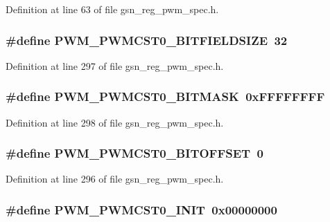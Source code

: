 Definition at line 63 of file gsn\_\-reg\_\-pwm\_\-spec.h.

\hypertarget{a00565_ac70a5c6184a303acb66c6d44fb1c2e29}{
\subsubsection[{PWM\_\-PWMCST0\_\-BITFIELDSIZE}]{\setlength{\rightskip}{0pt plus 5cm}\#define PWM\_\-PWMCST0\_\-BITFIELDSIZE~32}}
\label{a00565_ac70a5c6184a303acb66c6d44fb1c2e29}


Definition at line 297 of file gsn\_\-reg\_\-pwm\_\-spec.h.

\hypertarget{a00565_ae56f42c138da4a129af7e601a4081b66}{
\subsubsection[{PWM\_\-PWMCST0\_\-BITMASK}]{\setlength{\rightskip}{0pt plus 5cm}\#define PWM\_\-PWMCST0\_\-BITMASK~0xFFFFFFFF}}
\label{a00565_ae56f42c138da4a129af7e601a4081b66}


Definition at line 298 of file gsn\_\-reg\_\-pwm\_\-spec.h.

\hypertarget{a00565_ad1c39509570f96dc4f7e1c529729ba68}{
\subsubsection[{PWM\_\-PWMCST0\_\-BITOFFSET}]{\setlength{\rightskip}{0pt plus 5cm}\#define PWM\_\-PWMCST0\_\-BITOFFSET~0}}
\label{a00565_ad1c39509570f96dc4f7e1c529729ba68}


Definition at line 296 of file gsn\_\-reg\_\-pwm\_\-spec.h.

\hypertarget{a00565_a13e2ee4a3d5e3b5343e2888eafd63c35}{
\subsubsection[{PWM\_\-PWMCST0\_\-INIT}]{\setlength{\rightskip}{0pt plus 5cm}\#define PWM\_\-PWMCST0\_\-INIT~0x00000000}}
\label{a00565_a13e2ee4a3d5e3b5343e2888eafd63c35}


